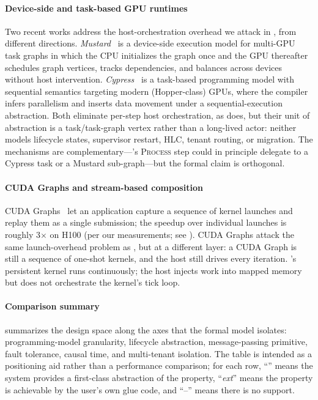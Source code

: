 \paragraph{Device-side and task-based GPU runtimes}
Two recent works address the host-orchestration overhead we attack
in , from different directions.
\emph{Mustard}~\citep{mustard2025} is a device-side execution model
for multi-GPU task graphs in which the CPU initializes the graph
once and the GPU thereafter schedules graph vertices, tracks
dependencies, and balances across devices without host
intervention.  \emph{Cypress}~\citep{cypress2025} is a task-based
programming model with sequential semantics targeting modern
(Hopper-class) GPUs, where the compiler infers parallelism and
inserts data movement under a sequential-execution abstraction.
Both eliminate per-step host orchestration, as \system{} does, but
their unit of abstraction is a task/task-graph vertex rather than a
long-lived actor: neither models lifecycle states, supervisor
restart, HLC, tenant routing, or migration.  The mechanisms are
complementary—\system{}'s \textsc{Process} step could in principle
delegate to a Cypress task or a Mustard sub-graph—but the formal
claim is orthogonal.

\paragraph{CUDA Graphs and stream-based composition}
CUDA Graphs~\citep{nvidia2023cooperative} let an application capture
a sequence of kernel launches and replay them as a single submission;
the speedup over individual launches is roughly 3$\times$ on H100
(per our measurements; see ).  CUDA Graphs
attack the same launch-overhead problem as \system{}, but at a
different layer: a CUDA Graph is still a sequence of one-shot
kernels, and the host still drives every iteration.  \system{}'s
persistent kernel runs continuously; the host injects work into
mapped memory but does not orchestrate the kernel's tick loop.

\paragraph{Comparison summary}
 summarizes the design space along the axes
that the formal model isolates: programming-model granularity,
lifecycle abstraction, message-passing primitive, fault tolerance,
causal time, and multi-tenant isolation.  The table is intended as
a positioning aid rather than a performance comparison; for each
row, ``\cmark'' means the system provides a first-class abstraction
of the property, ``\textit{ext}'' means the property is achievable
by the user's own glue code, and ``--'' means there is no support.

